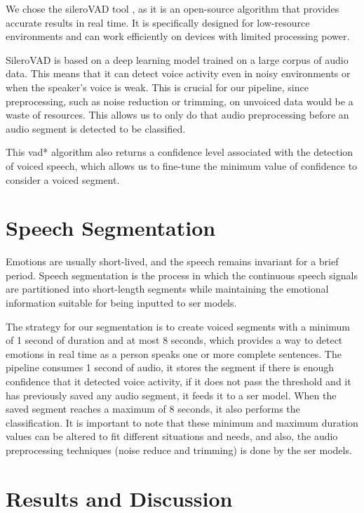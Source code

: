 We chose the sileroVAD tool \cite{SileroVAD}, as it is an open-source algorithm that provides accurate results in real time. It is specifically designed for low-resource environments and can work efficiently on devices with limited processing power.

SileroVAD is based on a deep learning model trained on a large corpus of audio data. This means that it can detect voice activity even in noisy environments or when the speaker's voice is weak. This is crucial for our pipeline, since preprocessing, such as noise reduction or trimming, on unvoiced data would be a waste of resources. This allows us to only do that audio preprocessing before an audio segment is detected to be classified.

This \ac{vad*} algorithm also returns a confidence level associated with the detection of voiced speech, which allows us to fine-tune the minimum value of confidence to consider a voiced segment.

\section{Speech Segmentation}

Emotions are usually short-lived, and the speech remains invariant for a brief period. Speech segmentation is the process in which the continuous speech signals are partitioned into short-length segments while maintaining the emotional information suitable for being inputted to \ac{ser} models.

The strategy for our segmentation is to create voiced segments with a minimum of 1 second of duration and at most 8 seconds, which provides a way to detect emotions in real time as a person speaks one or more complete sentences. The pipeline consumes 1 second of audio, it stores the segment if there is enough confidence that it detected voice activity, if it does not pass the threshold and it has previously saved any audio segment, it feeds it to a \ac{ser} model. When the saved segment reaches a maximum of 8 seconds, it also performs the classification. It is important to note that these minimum and maximum duration values can be altered to fit different situations and needs, and also, the audio preprocessing techniques (noise reduce and trimming) is done by the \ac{ser} models.


\section{Results and Discussion}

